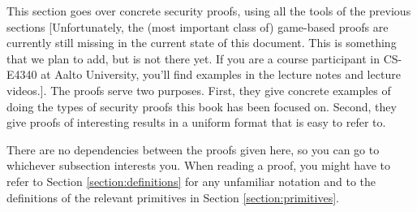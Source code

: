 This section goes over concrete security proofs, using all the tools of the previous sections {\color{blue}[Unfortunately, the (most important class of) game-based proofs are currently still missing in the current state of this document. This is something that we plan to add, but is not there yet. If you are a course participant in CS-E4340 at Aalto University, you'll find examples in the lecture notes and lecture videos.]}. The proofs serve two purposes. First, they give concrete examples of doing the types of security proofs this book has been focused on. Second, they give proofs of interesting results in a uniform format that is easy to refer to.

There are no dependencies between the proofs given here, so you can go to whichever subsection interests you. When reading a proof, you might have to refer to Section \ref{section:definitions} for any unfamiliar notation and to the definitions of the relevant primitives in Section \ref{section:primitives}.